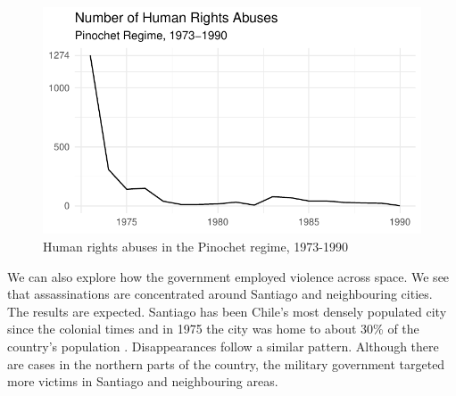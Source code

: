 \documentclass[12pt,a4paper,]{article}
\begin{document}
\vspace{.5cm}

\begin{figure}

{\centering \includegraphics{article_files/figure-latex/time-trend-1} 

}

\caption{Human rights abuses in the Pinochet regime, 1973-1990}\label{fig:time-trend}
\end{figure}

\vspace{.5cm}

We can also explore how the government employed violence across space.
We see that assassinations are concentrated around Santiago and
neighbouring cities. The results are expected. Santiago has been Chile's
most densely populated city since the colonial times and in 1975 the
city was home to about 30\% of the country's population
\citep{un1976yearbook}. Disappearances follow a similar pattern.
Although there are cases in the northern parts of the country, the
military government targeted more victims in Santiago and neighbouring
areas.
\end{document}
